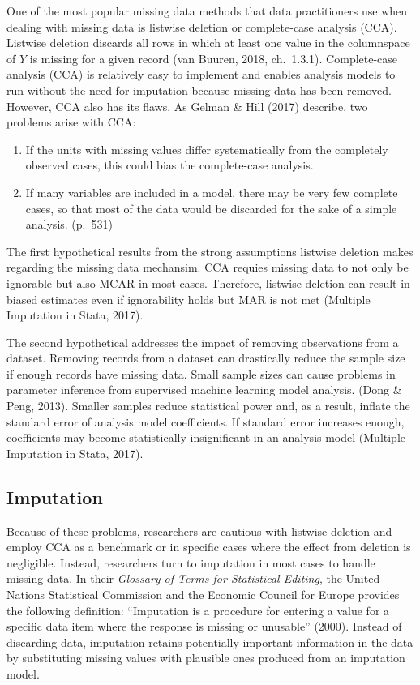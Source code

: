 \documentclass[12pt,oneside]{chicagocapstone}
\providecommand{\tightlist}{%
  \setlength{\itemsep}{0pt}\setlength{\parskip}{0pt}}
\begin{document}
One of the most popular missing data methods that data practitioners use
when dealing with missing data is listwise deletion or complete-case
analysis (CCA). Listwise deletion discards all rows in which at least
one value in the columnspace of \(Y\) is missing for a given record (van
Buuren, 2018, ch.~1.3.1). Complete-case analysis (CCA) is relatively
easy to implement and enables analysis models to run without the need
for imputation because missing data has been removed. However, CCA also
has its flaws. As Gelman \& Hill (2017) describe, two problems arise
with CCA:
\begin{enumerate}
\def\labelenumi{\arabic{enumi}.}
\tightlist
\item
  If the units with missing values differ systematically from the
  completely observed cases, this could bias the complete-case analysis.
\item
  If many variables are included in a model, there may be very few
  complete cases, so that most of the data would be discarded for the
  sake of a simple analysis. (p.~531)
\end{enumerate}
The first hypothetical results from the strong assumptions listwise
deletion makes regarding the missing data mechansim. CCA requies missing
data to not only be ignorable but also MCAR in most cases. Therefore,
listwise deletion can result in biased estimates even if ignorability
holds but MAR is not met (Multiple Imputation in Stata, 2017).

The second hypothetical addresses the impact of removing observations
from a dataset. Removing records from a dataset can drastically reduce
the sample size if enough records have missing data. Small sample sizes
can cause problems in parameter inference from supervised machine
learning model analysis. (Dong \& Peng, 2013). Smaller samples reduce
statistical power and, as a result, inflate the standard error of
analysis model coefficients. If standard error increases enough,
coefficients may become statistically insignificant in an analysis model
(Multiple Imputation in Stata, 2017).

\subsection*{Imputation}\label{background-imputation}

Because of these problems, researchers are cautious with listwise
deletion and employ CCA as a benchmark or in specific cases where the
effect from deletion is negligible. Instead, researchers turn to
imputation in most cases to handle missing data. In their \emph{Glossary
of Terms for Statistical Editing}, the United Nations Statistical
Commission and the Economic Council for Europe provides the following
definition: ``Imputation is a procedure for entering a value for a
specific data item where the response is missing or unusable'' (2000).
Instead of discarding data, imputation retains potentially important
information in the data by substituting missing values with plausible
ones produced from an imputation model.
\end{document}
